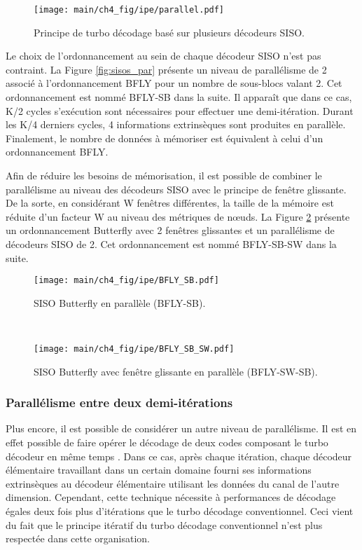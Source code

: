 \begin{figure}[!h]
	\centering
	\texttt{[image: main/ch4\_fig/ipe/parallel.pdf]}
	\caption{Principe de turbo décodage basé  sur plusieurs décodeurs SISO. \label{fig:turbo_par}}
\end{figure} 

Le choix de l'ordonnancement au sein de chaque décodeur SISO n'est pas contraint. La Figure \ref{fig:sisos_par} présente un niveau de 
parallélisme de 2 associé à l'ordonnancement BFLY pour un nombre de sous-blocs valant 2. Cet ordonnancement est nommé 
BFLY-SB dans la suite. Il apparaît que dans ce cas, K/2 cycles s'exécution sont nécessaires pour effectuer une demi-itération. 
Durant les K/4 derniers cycles, 4 informations extrinsèques sont produites en parallèle. Finalement, le nombre de
données à mémoriser est équivalent à celui d'un ordonnancement BFLY.

Afin de réduire les besoins de mémorisation, il est possible de combiner le parallélisme au niveau des décodeurs SISO avec le principe 
de fenêtre glissante. De la sorte, en considérant W fenêtres différentes, la taille de la mémoire est réduite d'un 
facteur W au niveau des métriques de nœuds. La Figure \ref{fig:sisos_par_sb} présente un ordonnancement Butterfly avec 
2 fenêtres glissantes et un parallélisme de décodeurs SISO de 2. Cet ordonnancement est nommé BFLY-SB-SW dans la suite.

\begin{figure}[!h]
    \centering
    \begin{minipage}[t]{.49\textwidth}
        \centering
        \texttt{[image: main/ch4\_fig/ipe/BFLY\_SB.pdf]}
		\caption{SISO Butterfly en parallèle (BFLY-SB). \label{fig:sisos_par}}
    \end{minipage}~~~~~~%
    \begin{minipage}[t]{0.49\textwidth}
        \centering
        \texttt{[image: main/ch4\_fig/ipe/BFLY\_SB\_SW.pdf]}
		\caption{SISO Butterfly avec fenêtre glissante en parallèle (BFLY-SW-SB). \label{fig:sisos_par_sb}}
    \end{minipage}
\end{figure}

\subsubsection{Parallélisme entre deux demi-itérations}
Plus encore, il est possible de considérer un autre niveau de parallélisme. Il est en effet possible de faire opérer le 
décodage de deux codes composant le turbo décodeur en même temps \cite{turbo_par}. Dans ce cas, après chaque itération, 
chaque décodeur élémentaire travaillant dans un certain domaine fourni ses informations extrinsèques au décodeur 
élémentaire utilisant les données du canal de l'autre dimension. Cependant, cette technique nécessite à performances de 
décodage égales deux fois plus d'itérations que le turbo décodage conventionnel. Ceci vient du fait que le principe 
itératif du turbo décodage conventionnel n'est plus respectée dans cette organisation.

